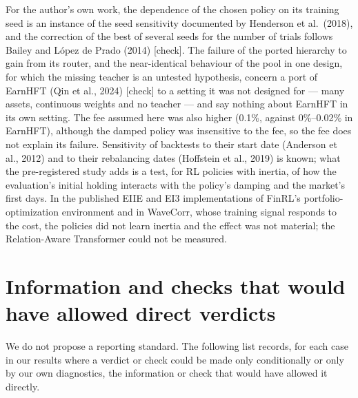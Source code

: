 \documentclass[12pt,a4paper]{report}
\begin{document}
For the author's own work, the dependence of the chosen policy on its
training seed is an instance of the seed sensitivity documented by
Henderson et al.~(2018), and the correction of the best of several seeds
for the number of trials follows Bailey and López de Prado (2014)
{[}check{]}. The failure of the ported hierarchy to gain from its
router, and the near-identical behaviour of the pool in one design, for
which the missing teacher is an untested hypothesis, concern a port of
EarnHFT (Qin et al., 2024) {[}check{]} to a setting it was not designed
for --- many assets, continuous weights and no teacher --- and say
nothing about EarnHFT in its own setting. The fee assumed here was also
higher (0.1\%, against 0\%--0.02\% in EarnHFT), although the damped
policy was insensitive to the fee, so the fee does not explain its
failure. Sensitivity of backtests to their start date (Anderson et al.,
2012) and to their rebalancing dates (Hoffstein et al., 2019) is known;
what the pre-registered study adds is a test, for RL policies with
inertia, of how the evaluation's initial holding interacts with the
policy's damping and the market's first days. In the published EIIE and
EI3 implementations of FinRL's portfolio-optimization environment and in
WaveCorr, whose training signal responds to the cost, the policies did
not learn inertia and the effect was not material; the Relation-Aware
Transformer could not be measured.

\section{Information and checks that would have allowed direct
verdicts}\label{information-and-checks-that-would-have-allowed-direct-verdicts}

We do not propose a reporting standard. The following list records, for
each case in our results where a verdict or check could be made only
conditionally or only by our own diagnostics, the information or check
that would have allowed it directly.
\end{document}
